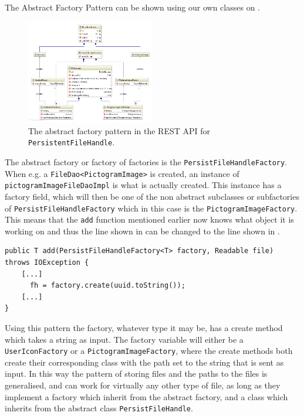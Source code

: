 The Abstract Factory Pattern can be shown using our own classes on .

\begin{figure}[h]
    \centering
    \includegraphics[width=0.5\textwidth]{figures/diagram-factory.png}
    \caption{The abstract factory pattern in the REST API for \texttt{PersistentFileHandle}.}\label{fig:asbtractFactory}
\end{figure}
The abstract factory or factory of factories is the \texttt{PersistFileHandleFactory}.
When e.g. a \texttt{FileDao<PictogramImage>} is created, an instance of \texttt{pictogramImageFileDaoImpl} is what is actually created. 
This instance has a factory field, which will then be one of the non abstract subclasses or subfactories of \texttt{PersistFileHandleFactory} which in this case is the \texttt{PictogramImageFactory}.
This means that the \texttt{add} function mentioned earlier now knows what object it is working on and thus the line shown in  can be changed to the line shown in .

\begin{lstlisting}[float, floatplacement=h, caption={Trying to use a Type Parameter constructor, which Java cannot do. \texttt{[...]} denotes omitted code.},label={lst:TypeParameterConstructorActual}]
public T add(PersistFileHandleFactory<T> factory, Readable file) throws IOException {
    [...]
      fh = factory.create(uuid.toString());
    [...]
}
\end{lstlisting}

Using this pattern the factory, whatever type it may be, has a create method which takes a string as input.
The factory variable will either be a \texttt{UserIconFactory} or a \texttt{PictogramImageFactory}, where the create methods both create their corresponding class with the path set to the string that is sent as input.
In this way the pattern of storing files and the paths to the files is generalised, and can work for virtually any other type of file, as long as they implement a factory which inherit from the abstract factory, and a class which inherits from the abstract class \texttt{PersistFileHandle}.

